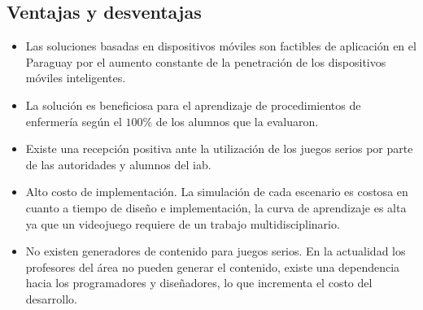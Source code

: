 \subsection{Ventajas y desventajas}

\begin{itemize}
\item Las soluciones basadas en dispositivos móviles son factibles de aplicación en el
	Paraguay por el aumento constante de la penetración de los dispositivos móviles
	inteligentes.
	
\item La solución es beneficiosa para el aprendizaje de procedimientos de enfermería según
	el $100\%$ de los alumnos que la evaluaron.
	
\item Existe una recepción positiva ante la utilización de los juegos serios por parte de las 
	autoridades y alumnos del \Gls{iab}.
	
%
%
\item Alto costo de implementación. La simulación de cada escenario es costosa en cuanto
a tiempo de diseño e implementación, la curva de aprendizaje es alta ya que un videojuego 
requiere de un trabajo multidisciplinario.

\item No existen generadores de contenido para juegos serios. En la actualidad los profesores
del área no pueden generar el contenido, existe una dependencia hacia los
programadores y diseñadores, lo que incrementa el costo del desarrollo.
\end{itemize}
